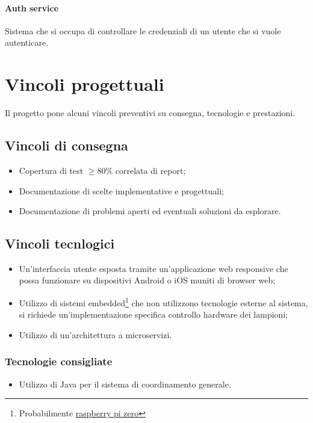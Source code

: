 \paragraph{Auth service} 
Sistema che si occupa di controllare le credenziali di un utente che si vuole autenticare.

\section{Vincoli progettuali}

Il progetto pone alcuni vincoli preventivi su consegna, tecnologie e prestazioni.

\subsection{Vincoli di consegna}
\begin{itemize}
    \item Copertura di test $\geq 80\%$ correlata di report;
    \item Documentazione di scelte implementative e progettuali;
    \item Documentazione di problemi aperti ed eventuali soluzioni da esplorare.
\end{itemize}

\subsection{Vincoli tecnlogici}
\begin{itemize}
    \item Un'interfaccia utente esposta tramite un'applicazione web responsive che possa funzionare su dispositivi Android o iOS muniti di browser web;
    \item Utilizzo di sistemi embedded\footnote{Probabilmente \href{https://www.raspberrypi.com/products/raspberry-pi-zero-w/}{raspberry pi zero}} che non utilizzono tecnologie esterne al sistema, si richiede un'implementazione specifica controllo hardware dei lampioni;
    \item Utilizzo di un'architettura a microservizi.
\end{itemize}

\subsubsection{Tecnologie consigliate}

\begin{itemize}
    \item Utilizzo di Java per il sistema di coordinamento generale.
\end{itemize}

